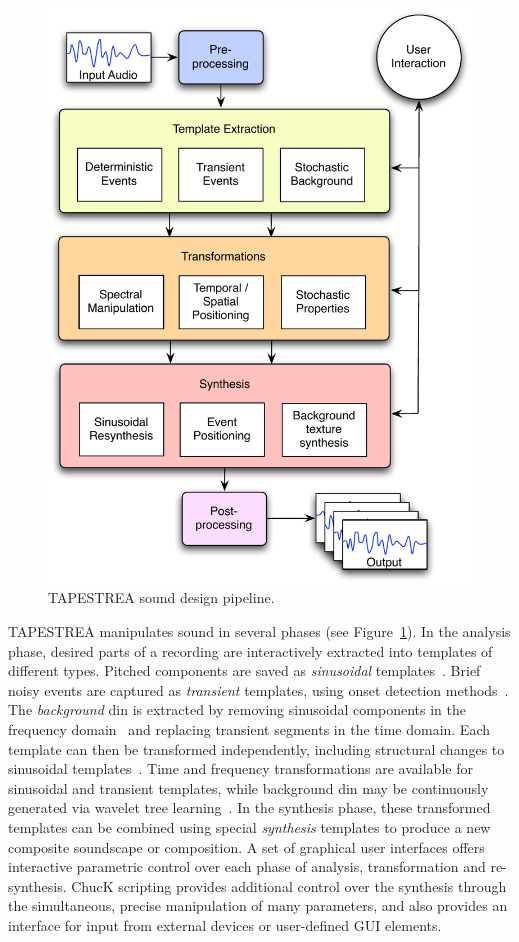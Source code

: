 \documentclass{sig-alt-release2}
\begin{document}
\begin{figure}[h]
\centering
\includegraphics[width=\columnwidth]{pipeline.pdf} %
\caption{TAPESTREA sound design pipeline.}
\label{fig:pipeline}
\end{figure}
TAPESTREA manipulates sound in several phases 
(see Figure~\ref{fig:pipeline}). 
In the analysis phase, desired parts of a recording are interactively extracted into templates of different types. Pitched components are saved as \textit{sinusoidal} templates~\cite{Serra89}. Brief noisy events are captured as \textit{transient} templates, using onset detection methods~\cite{Bello05}. The \textit{background} din is extracted by removing sinusoidal components in the frequency domain~\cite{Serra89} and replacing transient segments in the time domain. Each template can then be transformed independently, including structural changes to sinusoidal templates~\cite{Lieber08}. Time and frequency transformations are available for sinusoidal and transient templates, while background din may be continuously generated via wavelet tree learning~\cite{Dubnov02}. In the synthesis phase, these transformed templates can be combined using special \textit{synthesis} templates to produce a new composite soundscape or composition. A set of graphical user interfaces offers interactive parametric control over each phase of analysis, transformation and re-synthesis. ChucK scripting provides additional control over the synthesis through the simultaneous, precise manipulation of many parameters, and also provides an interface for input from external devices or user-defined GUI elements. 
\end{document}
